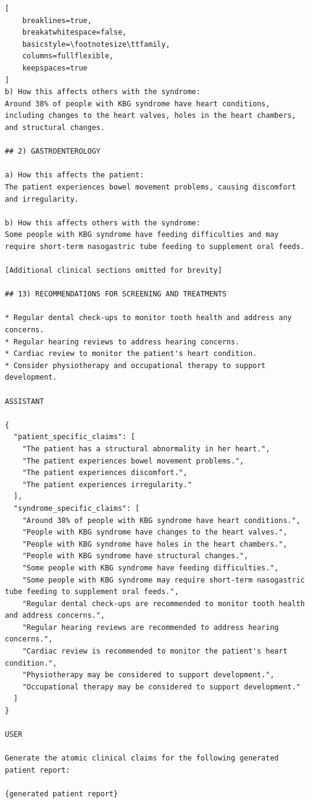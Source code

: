 \documentclass[ %
                    author={Aman Kumar Singh},
                supervisor={Dr. Edwin Simpson},
                    degree={MSc},
                     title={Quality-Aware Knowledge Distillation of Large Language Models for Efficient Personalised Clinical Report Generation},
                  subtitle={},
                      type={},
                      year={2021}]{dissertation}
\begin{document}
\begin{lstlisting}[
    breaklines=true,
    breakatwhitespace=false,
    basicstyle=\footnotesize\ttfamily,
    columns=fullflexible,
    keepspaces=true
]
b) How this affects others with the syndrome:
Around 38% of people with KBG syndrome have heart conditions,
including changes to the heart valves, holes in the heart chambers,
and structural changes.

## 2) GASTROENTEROLOGY

a) How this affects the patient:
The patient experiences bowel movement problems, causing discomfort
and irregularity.

b) How this affects others with the syndrome:
Some people with KBG syndrome have feeding difficulties and may
require short-term nasogastric tube feeding to supplement oral feeds.

[Additional clinical sections omitted for brevity]

## 13) RECOMMENDATIONS FOR SCREENING AND TREATMENTS

* Regular dental check-ups to monitor tooth health and address any concerns.
* Regular hearing reviews to address hearing concerns.
* Cardiac review to monitor the patient's heart condition.
* Consider physiotherapy and occupational therapy to support development.

ASSISTANT

{
  "patient_specific_claims": [
    "The patient has a structural abnormality in her heart.",
    "The patient experiences bowel movement problems.",
    "The patient experiences discomfort.",
    "The patient experiences irregularity."
  ],
  "syndrome_specific_claims": [
    "Around 38% of people with KBG syndrome have heart conditions.",
    "People with KBG syndrome have changes to the heart valves.",
    "People with KBG syndrome have holes in the heart chambers.",
    "People with KBG syndrome have structural changes.",
    "Some people with KBG syndrome have feeding difficulties.",
    "Some people with KBG syndrome may require short-term nasogastric tube feeding to supplement oral feeds.",
    "Regular dental check-ups are recommended to monitor tooth health and address concerns.",
    "Regular hearing reviews are recommended to address hearing concerns.",
    "Cardiac review is recommended to monitor the patient's heart condition.",
    "Physiotherapy may be considered to support development.",
    "Occupational therapy may be considered to support development."
  ]
}

USER

Generate the atomic clinical claims for the following generated
patient report:

{generated patient report}
\end{lstlisting}
\end{document}
